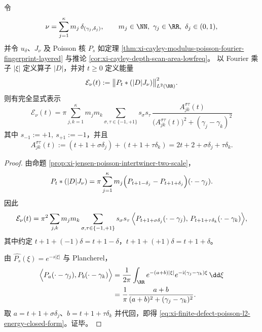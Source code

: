 \begin{theorem}\label{thm:xi-finite-defect-poisson-l2-energy-closed-form}
令
\[
\nu=\sum_{j=1}^{\kappa}m_j\,\delta_{(\gamma_j,\delta_j)},
\qquad
m_j\in\NN,\ \gamma_j\in\RR,\ \delta_j\in(0,1),
\]
并令 \(u_\delta\)、\(J_\nu\) 及 Poisson 核 \(P_s\) 如定理
\ref{thm:xi-cayley-modulus-poisson-fourier-fingerprint-layered} 与推论
\ref{cor:xi-cayley-depth-scan-area-lowfreq}。
以 Fourier 乘子 \(|\xi|\) 定义算子 \(|D|\)，并对 \(t\ge 0\) 定义能量
\[
\mathcal E_\nu(t):=\bigl\|P_t*(|D|J_\nu)\bigr\|_{L^2(\RR)}^2.
\]
则有完全显式表示
\begin{equation}\label{eq:xi-finite-defect-poisson-l2-energy-closed-form}
\boxed{\;
\mathcal E_\nu(t)
=
\pi\sum_{j,k=1}^{\kappa}m_jm_k
\sum_{\sigma,\tau\in\{-1,+1\}} s_\sigma s_\tau\,
\frac{A_{jk}^{\sigma\tau}(t)}{\bigl(A_{jk}^{\sigma\tau}(t)\bigr)^2+(\gamma_j-\gamma_k)^2}\; }
\end{equation}
其中 \(s_{-1}:=+1,\ s_{+1}:=-1\)，并且
\[
A_{jk}^{\sigma\tau}(t):=(t+1+\sigma\delta_j)+(t+1+\tau\delta_k)=2t+2+\sigma\delta_j+\tau\delta_k.
\]
\end{theorem}
\begin{proof}
由命题 \ref{prop:xi-jensen-poisson-intertwiner-two-scale}，
\[
P_t*(|D|J_\nu)
=\pi\sum_{j=1}^{\kappa}m_j\Bigl(P_{t+1-\delta_j}-P_{t+1+\delta_j}\Bigr)(\cdot-\gamma_j).
\]
因此
\[
\mathcal E_\nu(t)
=\pi^2\sum_{j,k}m_jm_k
\sum_{\sigma,\tau\in\{-1,+1\}} s_\sigma s_\tau\,
\Bigl\langle P_{t+1+\sigma\delta_j}(\cdot-\gamma_j),\,P_{t+1+\tau\delta_k}(\cdot-\gamma_k)\Bigr\rangle,
\]
其中约定 \(t+1+(-1)\delta=t+1-\delta\)，\(t+1+(+1)\delta=t+1+\delta\)。
\par
由 \(\widehat{P_s}(\xi)=e^{-s|\xi|}\) 与 Plancherel，
\begin{align*}
\Bigl\langle P_a(\cdot-\gamma_j),P_b(\cdot-\gamma_k)\Bigr\rangle
&=\frac{1}{2\pi}\int_{\RR}e^{-(a+b)|\xi|}e^{-\mathrm{i}(\gamma_j-\gamma_k)\xi}\,\dd\xi\\
&=\frac{1}{\pi}\frac{a+b}{(a+b)^2+(\gamma_j-\gamma_k)^2}.
\end{align*}
取 \(a=t+1+\sigma\delta_j\)、\(b=t+1+\tau\delta_k\) 并代回，即得
\eqref{eq:xi-finite-defect-poisson-l2-energy-closed-form}。证毕。
\end{proof}

